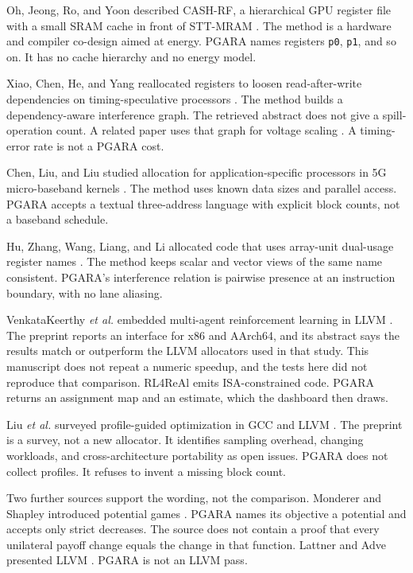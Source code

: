 \documentclass{ieeeaccess}
\begin{document}
Oh, Jeong, Ro, and Yoon described CASH-RF, a hierarchical GPU register file with a small SRAM cache in front of STT-MRAM \cite{oh2022}.
The method is a hardware and compiler co-design aimed at energy.
PGARA names registers \texttt{p0}, \texttt{p1}, and so on.
It has no cache hierarchy and no energy model.

Xiao, Chen, He, and Yang reallocated registers to loosen read-after-write dependencies on timing-speculative processors \cite{xiao2023}.
The method builds a dependency-aware interference graph.
The retrieved abstract does not give a spill-operation count.
A related paper uses that graph for voltage scaling \cite{xiao2022}.
A timing-error rate is not a PGARA cost.

Chen, Liu, and Liu studied allocation for application-specific processors in 5G micro-baseband kernels \cite{chen2022}.
The method uses known data sizes and parallel access.
PGARA accepts a textual three-address language with explicit block counts, not a baseband schedule.

Hu, Zhang, Wang, Liang, and Li allocated code that uses array-unit dual-usage register names \cite{hu2022}.
The method keeps scalar and vector views of the same name consistent.
PGARA's interference relation is pairwise presence at an instruction boundary, with no lane aliasing.

VenkataKeerthy \emph{et al.} embedded multi-agent reinforcement learning in LLVM \cite{venkatakeerthy2022}.
The preprint reports an interface for x86 and AArch64, and its abstract says the results match or outperform the LLVM allocators used in that study.
This manuscript does not repeat a numeric speedup, and the tests here did not reproduce that comparison.
RL4ReAl emits ISA-constrained code.
PGARA returns an assignment map and an estimate, which the dashboard then draws.

Liu \emph{et al.} surveyed profile-guided optimization in GCC and LLVM \cite{liu2025}.
The preprint is a survey, not a new allocator.
It identifies sampling overhead, changing workloads, and cross-architecture portability as open issues.
PGARA does not collect profiles.
It refuses to invent a missing block count.

Two further sources support the wording, not the comparison.
Monderer and Shapley introduced potential games \cite{monderer1996}.
PGARA names its objective a potential and accepts only strict decreases.
The source does not contain a proof that every unilateral payoff change equals the change in that function.
Lattner and Adve presented LLVM \cite{lattner2004}.
PGARA is not an LLVM pass.
\end{document}
